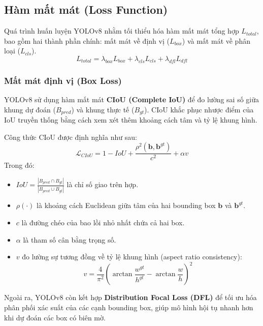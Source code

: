 \subsection{Hàm mất mát (Loss Function)}
Quá trình huấn luyện YOLOv8 nhằm tối thiểu hóa hàm mất mát tổng hợp $L_{total}$, bao gồm hai thành phần chính: mất mát về định vị ($L_{box}$) và mất mát về phân loại ($L_{cls}$).
\begin{equation}
    L_{total} = \lambda_{box} L_{box} + \lambda_{cls} L_{cls} + \lambda_{dfl} L_{dfl}
\end{equation}

\subsubsection{Mất mát định vị (Box Loss)}
YOLOv8 sử dụng hàm mất mát \textbf{CIoU (Complete IoU)} để đo lường sai số giữa khung dự đoán ($B_{pred}$) và khung thực tế ($B_{gt}$). CIoU khắc phục nhược điểm của IoU truyền thống bằng cách xem xét thêm khoảng cách tâm và tỷ lệ khung hình.

Công thức CIoU được định nghĩa như sau:
\begin{equation}
    \mathcal{L}_{CIoU} = 1 - IoU + \frac{\rho^2(\mathbf{b}, \mathbf{b}^{gt})}{c^2} + \alpha v
\end{equation}
Trong đó:
\begin{itemize}
    \item $IoU = \frac{|B_{pred} \cap B_{gt}|}{|B_{pred} \cup B_{gt}|}$ là chỉ số giao trên hợp.
    \item $\rho(\cdot)$ là khoảng cách Euclidean giữa tâm của hai bounding box $\mathbf{b}$ và $\mathbf{b}^{gt}$.
    \item $c$ là đường chéo của bao lồi nhỏ nhất chứa cả hai box.
    \item $\alpha$ là tham số cân bằng trọng số.
    \item $v$ đo lường sự tương đồng về tỷ lệ khung hình (aspect ratio consistency):
    \begin{equation}
        v = \frac{4}{\pi^2} \left( \arctan\frac{w^{gt}}{h^{gt}} - \arctan\frac{w}{h} \right)^2
    \end{equation}
\end{itemize}

Ngoài ra, YOLOv8 còn kết hợp \textbf{Distribution Focal Loss (DFL)} để tối ưu hóa phân phối xác suất của các cạnh bounding box, giúp mô hình hội tụ nhanh hơn khi dự đoán các box có biên mờ.

